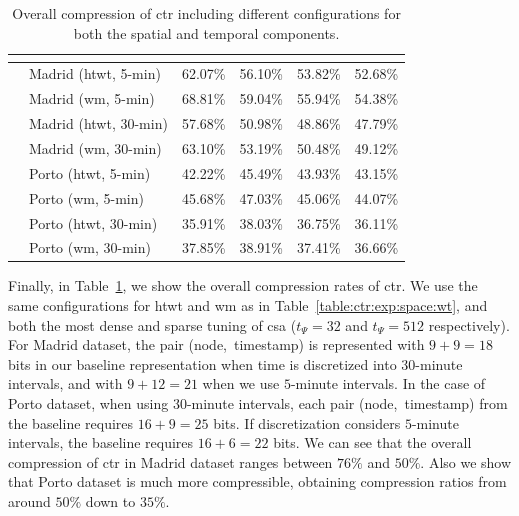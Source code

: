 \begin{table}[ht]
\begin{center}
\begin{tabular}{|c|l|*{4}{c}|}
	  \multicolumn{5}{c}{} \\
	  \hline   
	  \multirow{8}{*}{\STAB{\rotatebox[origin=c]{90}{$t_{\Psi}=512$}}}
	   & Madrid (\gls{htwt}, 5-min) & 62.07\% &	56.10\% &	53.82\% &	 52.68\% \\
	   & Madrid (\gls{wm}, 5-min)   & 68.81\% &	59.04\% &	55.94\% &	 54.38\% \\
	   & Madrid (\gls{htwt}, 30-min) &  57.68\% &	50.98\% &	48.86\% &	 47.79\% \\
	   & Madrid (\gls{wm}, 30-min)  & 63.10\% &	53.19\% &	50.48\% &	 49.12\% \\
	  \cline{2-6}
	   & Porto (\gls{htwt}, 5-min)   & 42.22\% &	45.49\% &	43.93\% &	 43.15\% \\
	   & Porto (\gls{wm}, 5-min)      & 45.68\% &	47.03\% &	45.06\% &	 44.07\% \\
	   & Porto (\gls{htwt}, 30-min)  & 35.91\% &	38.03\% &	36.75\% &	 36.11\% \\
	   & Porto (\gls{wm}, 30-min)   & 37.85\% &	38.91\% &	37.41\% &	 36.66\% \\
	  \hline
	  \end{tabular}
	\end{center}
	
	\caption{Overall compression of \acrshort{ctr} including different configurations for both the spatial and temporal components.}
	\label{table:ctr:exp:space:ctr}
	\end{table}


    \medskip
	Finally, in Table~\ref{table:ctr:exp:space:ctr}, we show the overall compression rates of  \gls{ctr}.
	We use the same configurations for \gls{htwt} and \gls{wm}  as in Table~\ref{table:ctr:exp:space:wt}, and both the
	most dense and sparse tuning of \gls{csa} ($t_{\Psi}= 32$ and $t_{\Psi}= 512$ respectively).
	For Madrid dataset, the pair \mbox{(node, timestamp)} is represented with $9+9=18$ bits in our baseline representation 
	when time is discretized into $30$-minute intervals, and with $9+12=21$ when we use $5$-minute intervals.
	In the case of Porto dataset, when using $30$-minute intervals, each pair \mbox{(node, timestamp)} from the baseline requires $16+9=25$ bits. 
	If discretization considers $5$-minute intervals, the baseline requires $16+6=22$ bits. We can see that the overall
	compression of \gls{ctr} in Madrid dataset ranges between $76\%$ and $50\%$. Also we show that Porto dataset is much
	more compressible, obtaining compression ratios from around $50\%$ down to $35\%$.


